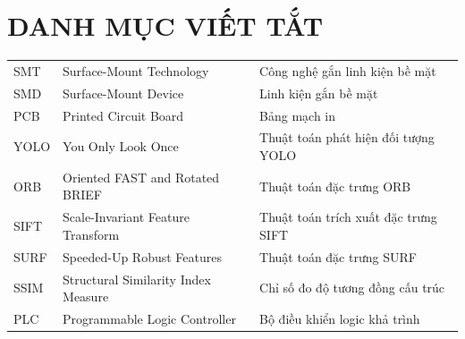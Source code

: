 \chapter*{DANH MỤC VIẾT TẮT}

\begin{center}
\begin{tabular}{ l  l l }
SMT & Surface-Mount Technology & Công nghệ gắn linh kiện bề mặt \\
SMD & Surface-Mount Device & Linh kiện gắn bề mặt \\
PCB & Printed Circuit Board & Bảng mạch in \\
YOLO & You Only Look Once & Thuật toán phát hiện đối tượng YOLO \\
ORB & Oriented FAST and Rotated BRIEF & Thuật toán đặc trưng ORB \\
SIFT & Scale-Invariant Feature Transform & Thuật toán trích xuất đặc trưng SIFT \\
SURF & Speeded-Up Robust Features & Thuật toán đặc trưng SURF \\
SSIM & Structural Similarity Index Measure & Chỉ số đo độ tương đồng cấu trúc \\
PLC & Programmable Logic Controller & Bộ điều khiển logic khả trình \\
\end{tabular}

\end{center}
